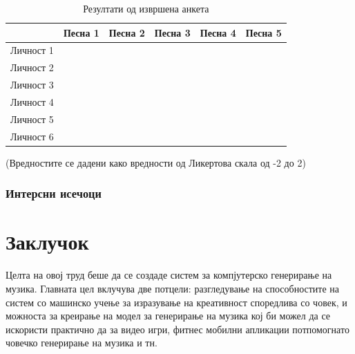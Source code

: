 \begin{table}[H]
    \centering
\begin{tabular}{@{}llllll@{}}
\toprule
   & \multicolumn{1}{c}{Песна 1} & Песна 2 & Песна 3 & Песна 4 & Песна 5 \\ \midrule
Личност 1 &                             &         &         &         &         \\
Личност 2 &                             &         &         &         &         \\
Личност 3 &                             &         &         &         &         \\
Личност 4 &                             &         &         &         &         \\
Личност 5 &                             &         &         &         &         \\
Личност 6 &                             &         &         &         &         \\ \bottomrule
\end{tabular}
    \caption{Резултати од извршена анкета}
    (Вредностите се дадени како вредности од Ликертова скала од -2 до 2)
    \label{tab:anketa}
\end{table}

\subsection{Интерсни исечоци}



\chapter{Заклучок}
\label{ch:zaklucok}

Целта на овој труд беше да се создаде систем за компјутерско генерирање на музика. Главната цел вклучува две потцели: разгледување на способностите на систем со машинско учење за изразување на креативност споредлива со човек, и можноста за креирање на модел за генерирање на музика кој би можел да се искористи практично да за видео игри, фитнес мобилни апликации потпомогнато човечко генерирање на музика и тн. 

